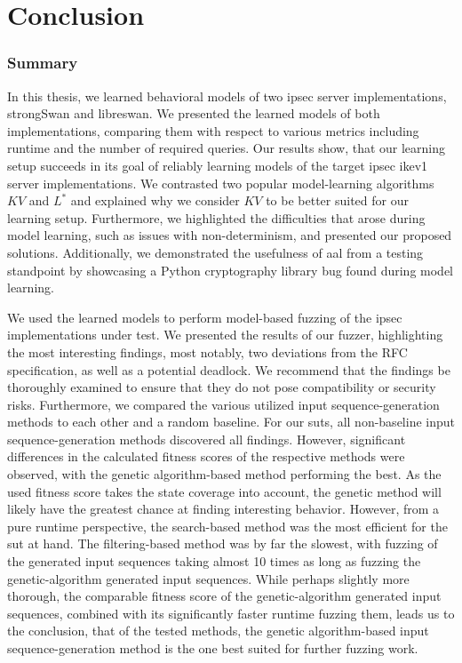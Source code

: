 %
%
% 

\chapter{Conclusion}
\label{chap:Conclusion}

\subsection{Summary}
In this thesis, we learned behavioral models of two \ac{ipsec} server implementations, strongSwan and libreswan. We presented the learned models of both implementations, comparing them with respect to various metrics including runtime and the number of required queries. Our results show, that our learning setup succeeds in its goal of reliably learning models of the target \ac{ipsec} \ac{ike}v1 server implementations. We contrasted two popular model-learning algorithms $KV$ and $L^*$ and explained why we consider $KV$ to be better suited for our learning setup. Furthermore, we highlighted the difficulties that arose during model learning, such as issues with non-determinism, and presented our proposed solutions. Additionally, we demonstrated the usefulness of \ac{aal} from a testing standpoint by showcasing a Python cryptography library bug found during model learning. 

We used the learned models to perform model-based fuzzing of the \ac{ipsec} implementations under test. We presented the results of our fuzzer, highlighting the most interesting findings, most notably, two deviations from the RFC specification, as well as a potential deadlock. We recommend that the findings be thoroughly examined to ensure that they do not pose compatibility or security risks. Furthermore, we compared the various utilized input sequence-generation methods to each other and a random baseline. For our \acp{sut}, all non-baseline input sequence-generation methods discovered all findings. However, significant differences in the calculated fitness scores of the respective methods were observed, with the genetic algorithm-based method performing the best. As the used fitness score takes the state coverage into account, the genetic method will likely have the greatest chance at finding interesting behavior. However, from a pure runtime perspective, the search-based method was the most efficient for the \ac{sut} at hand. The filtering-based method was by far the slowest, with fuzzing of the generated input sequences taking almost 10 times as long as fuzzing the genetic-algorithm generated input sequences. While perhaps slightly more thorough, the comparable fitness score of the genetic-algorithm generated input sequences, combined with its significantly faster runtime fuzzing them, leads us to the conclusion, that of the tested methods, the genetic algorithm-based input sequence-generation method is the one best suited for further fuzzing work.

